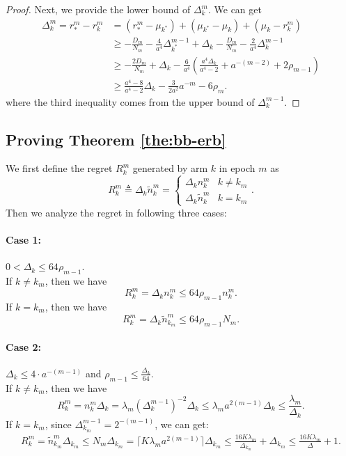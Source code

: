 \begin{proof}
    Next, we provide the lower bound of $\Delta_k^m$. We can get
    \begin{equation*}
    \begin{split}
        \Delta_k^m =  r_*^m - r_k^m
        &= (r_*^m - \mu_{k^*}) + (\mu_{k^*} - \mu_k) + (\mu_k - r_k^m) \\
        &\geq -\frac{D_m}{N_m} - \frac{4}{a^4}\Delta_{k^*}^{m-1} + \Delta_k -\frac{D_m}{N_m} - \frac{2}{a^4}\Delta_k^{m-1} \\
        &\geq -\frac{2D_m}{N_m} + \Delta_k - \frac{6}{a^4}\left(\frac{a^4 \Delta_k}{a^4 - 2} + a^{-(m-2)} + 2\rho_{m-1}\right) \\
        &\geq \frac{a^4 - 8}{a^4 - 2}\Delta_k - \frac{3}{2a^2}a^{-m} - 6\rho_m.
    \end{split}
    \end{equation*}
    where the third inequality comes from the upper bound of $\Delta_k^{m-1}$.
\end{proof}

\subsection{Proving Theorem \ref{the:bb-erb}}

We first define the regret $R_k^m$ generated by arm $k$ in epoch $m$ as 
\[R_k^m\triangleq\Delta_k\widetilde{n}_{k}^m=\begin{cases}
    \Delta_kn_{k}^m & k\neq k_m\\
    \Delta_k\widetilde{n}_{k}^m & k=k_m
\end{cases}.\]
Then we analyze the regret in following three cases:

\paragraph{Case 1:} $0<\Delta_k\le 64\rho_{m-1}$.\\ %
If $k \neq k_m$, then we have \[R_k^m=\Delta_k n_{k}^m\le 64\rho_{m-1}n_k^m .\] 
If $k=k_m$, then we have \[R_k^m=\Delta_k\widetilde{n}_{k_m}^m\le 64\rho_{m-1}N_m.\]

\paragraph{Case 2:} $\Delta_k \leq 4 \cdot a^{-(m-1)}$ and $\rho_{m-1} \leq \frac{\Delta_k}{64}$.\\
If $k \neq k_m$, then we have \[R_k^m=n_{k}^m\Delta_k =\lambda_m(\Delta_k^{m-1})^{-2} \Delta_k \leq \lambda_m a^{2(m-1)} \Delta_k  \leq \frac{\lambda_m}{\Delta_k}.\] 
If $k=k_m$, since $\Delta_{k_m}^{m-1} = 2^{-(m-1)}$, we can get:
\begin{align*}
    R_k^m=\widetilde{n}_{k_m}^m \Delta_{k_m} \leq 
    N_m\Delta_{k_m} = \lceil K\lambda_m a^{2(m-1)}\rceil \Delta_{k_m} \leq \frac{16K\lambda_m}{\Delta_{k_m}} + \Delta_{k_m} \leq \frac{16K\lambda_m}{\Delta} + 1.
\end{align*}

